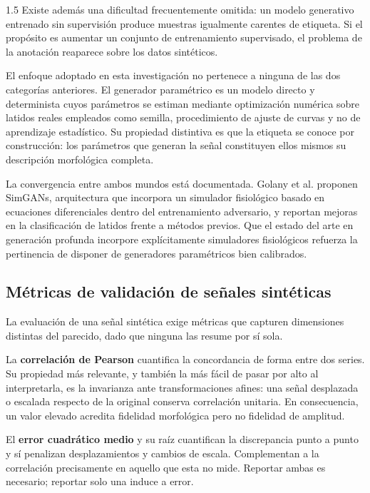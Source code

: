 \begin{spacing}{1.5}
Existe además una dificultad frecuentemente omitida: un modelo generativo entrenado sin supervisión produce muestras igualmente carentes de etiqueta. Si el propósito es aumentar un conjunto de entrenamiento supervisado, el problema de la anotación reaparece sobre los datos sintéticos.

El enfoque adoptado en esta investigación no pertenece a ninguna de las dos categorías anteriores. El generador paramétrico es un modelo directo y determinista cuyos parámetros se estiman mediante optimización numérica sobre latidos reales empleados como semilla, procedimiento de ajuste de curvas y no de aprendizaje estadístico. Su propiedad distintiva es que la etiqueta se conoce por construcción: los parámetros que generan la señal constituyen ellos mismos su descripción morfológica completa.

La convergencia entre ambos mundos está documentada. Golany et al. \cite{golany2020simgans} proponen SimGANs, arquitectura que incorpora un simulador fisiológico basado en ecuaciones diferenciales dentro del entrenamiento adversario, y reportan mejoras en la clasificación de latidos frente a métodos previos. Que el estado del arte en generación profunda incorpore explícitamente simuladores fisiológicos refuerza la pertinencia de disponer de generadores paramétricos bien calibrados.

\subsection{Métricas de validación de señales sintéticas}

La evaluación de una señal sintética exige métricas que capturen dimensiones distintas del parecido, dado que ninguna las resume por sí sola.

La \textbf{correlación de Pearson} cuantifica la concordancia de forma entre dos series. Su propiedad más relevante, y también la más fácil de pasar por alto al interpretarla, es la invarianza ante transformaciones afines: una señal desplazada o escalada respecto de la original conserva correlación unitaria. En consecuencia, un valor elevado acredita fidelidad morfológica pero no fidelidad de amplitud.

El \textbf{error cuadrático medio} y su raíz cuantifican la discrepancia punto a punto y sí penalizan desplazamientos y cambios de escala. Complementan a la correlación precisamente en aquello que esta no mide. Reportar ambas es necesario; reportar solo una induce a error.


\end{spacing}
